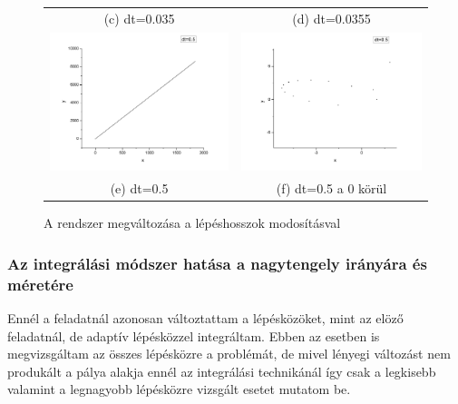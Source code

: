 \documentclass[paper=a4, fontsize=11pt]{article}
\begin{document}
\begin{figure}[H]
\begin{tabular}{cc}
(c) dt=0.035 & (d) dt=0.0355 \\[6pt]
 \includegraphics[width=65mm]{f05} &   \includegraphics[width=65mm]{f05k} \\
(e) dt=0.5 & (f) dt=0.5 a 0 körül \\[6pt]
\end{tabular}
\caption{A rendszer megváltozása a lépéshosszok modosításval}
\end{figure}

\subsubsection{Az integrálási módszer hatása a nagytengely irányára és méretére}
Ennél a feladatnál azonosan változtattam a lépésközöket, mint az elöző feladatnál, de adaptív lépésközzel integráltam. Ebben az esetben is megvizsgáltam az összes lépésközre a problémát, de mivel lényegi változást nem produkált a pálya alakja ennél az integrálási technikánál így csak a legkisebb valamint a legnagyobb lépésközre vizsgált esetet mutatom be.
\end{document}
